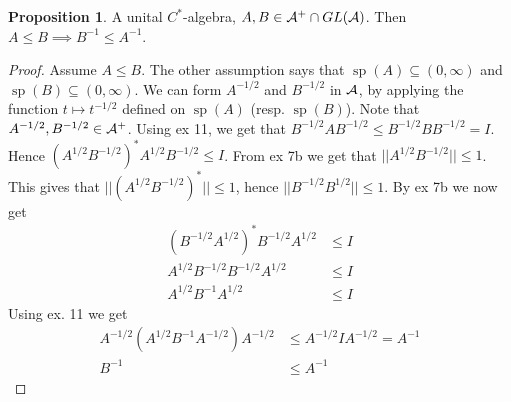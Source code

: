 \documentclass[10pt,english,a4paper]{article}
\theoremstyle{definition}
\newtheorem*{proposition}{Proposition}
\DeclareMathOperator{\Sp}{sp}
\begin{document}
\begin{proposition}
    A unital $C^*$-algebra, $A,B \in \mathcal{A}^+ \cap GL(\mathcal{A})$. Then 
$A \leq B \implies B^{-1} \leq A^{-1}$.
\end{proposition}
\begin{proof}
    Assume $A \leq B$. The other assumption says that 
    $\Sp(A) \subseteq (0,\infty)$ and $\Sp(B) \subseteq (0,\infty)$. 
    We can form $A^{-1/2}$ and $B^{-1/2}$ in $\mathcal{A}$, by applying the 
    function $t \mapsto t^{-1/2}$ defined on $\Sp(A)$ (resp. $\Sp(B)$).
    Note that $A^{-1/2}, B^{-1/2} \in \mathcal{A}^+$.
    Using ex 11, we get that $B^{-1/2}AB^{-1/2} \leq B^{-1/2}BB^{-1/2} = I$. 
    Hence $(A^{1/2}B^{-1/2})^* A^{1/2}B^{-1/2} \leq I$. 
    From ex 7b we get that $||A^{1/2}B^{-1/2} || \leq 1$. This gives that
    $||(A^{1/2}B^{-1/2})^* || \leq 1$, hence $||B^{-1/2}B^{1/2}|| \leq 1$. 
    By ex 7b we now get 
    \begin{align*}
        (B^{-1/2}A^{1/2})^* B^{-1/2}A^{1/2} &\leq I \\
        A^{1/2}B^{-1/2} B^{-1/2}A^{1/2} &\leq I \\
        A^{1/2}B^{-1} A^{1/2} &\leq I 
    \end{align*}
Using ex. 11 we get 
\begin{align*}
    A^{-1/2} (A^{1/2}B^{-1}A^{-1/2})A^{-1/2} &\leq A^{-1/2}IA^{-1/2} = A^{-1} \\
    B^{-1} &\leq A^{-1}
\end{align*}
\end{proof}
\end{document}
